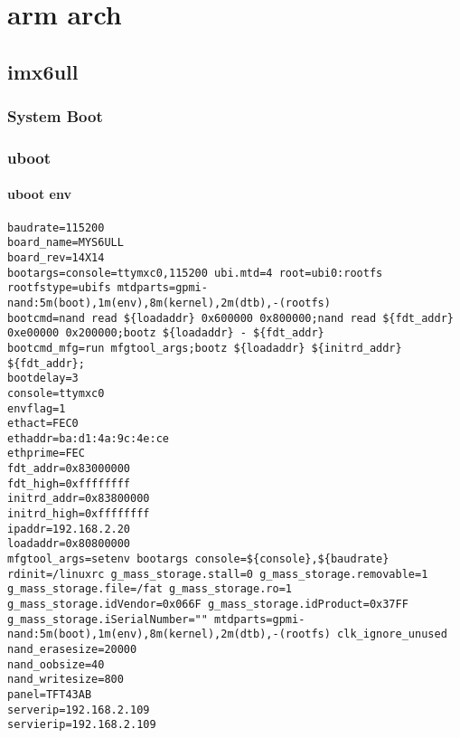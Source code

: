\part{arm arch}


\chapter{imx6ull}


\section{System Boot}



\section{uboot}



\subsection{uboot env}
\begin{lstlisting}
baudrate=115200
board_name=MYS6ULL
board_rev=14X14
bootargs=console=ttymxc0,115200 ubi.mtd=4 root=ubi0:rootfs rootfstype=ubifs mtdparts=gpmi-nand:5m(boot),1m(env),8m(kernel),2m(dtb),-(rootfs)
bootcmd=nand read ${loadaddr} 0x600000 0x800000;nand read ${fdt_addr} 0xe00000 0x200000;bootz ${loadaddr} - ${fdt_addr}
bootcmd_mfg=run mfgtool_args;bootz ${loadaddr} ${initrd_addr} ${fdt_addr};
bootdelay=3
console=ttymxc0
envflag=1
ethact=FEC0
ethaddr=ba:d1:4a:9c:4e:ce
ethprime=FEC
fdt_addr=0x83000000
fdt_high=0xffffffff
initrd_addr=0x83800000
initrd_high=0xffffffff
ipaddr=192.168.2.20
loadaddr=0x80800000
mfgtool_args=setenv bootargs console=${console},${baudrate} rdinit=/linuxrc g_mass_storage.stall=0 g_mass_storage.removable=1 g_mass_storage.file=/fat g_mass_storage.ro=1 g_mass_storage.idVendor=0x066F g_mass_storage.idProduct=0x37FF g_mass_storage.iSerialNumber="" mtdparts=gpmi-nand:5m(boot),1m(env),8m(kernel),2m(dtb),-(rootfs) clk_ignore_unused
nand_erasesize=20000
nand_oobsize=40
nand_writesize=800
panel=TFT43AB
serverip=192.168.2.109
servierip=192.168.2.109

\end{lstlisting}
